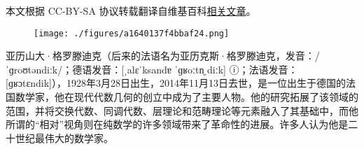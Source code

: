 
本文根据 CC-BY-SA 协议转载翻译自维基百科\href{https://en.wikipedia.org/wiki/Alexander_Grothendieck#Mathematical_work}{相关文章}。

\begin{figure}[ht]
\centering
\texttt{[image: ./figures/a1640137f4bbaf24.png]}
\caption{} \label{fig_AlGr_1}
\end{figure}
亚历山大·格罗滕迪克（后来的法语名为亚历克斯·格罗滕迪克，发音：/ˈɡroʊtəndiːk/；德语发音：[ˌalɛˈksandɐ ˈɡʁoːtn̩ˌdiːk] ⓘ；法语发音：[ɡʁɔtɛndik]），1928年3月28日出生，2014年11月13日去世，是一位出生于德国的法国数学家，他在现代代数几何的创立中成为了主要人物。他的研究拓展了该领域的范围，并将交换代数、同调代数、层理论和范畴理论等元素融入了其基础中，而他所谓的“相对”视角则在纯数学的许多领域带来了革命性的进展。许多人认为他是二十世纪最伟大的数学家。